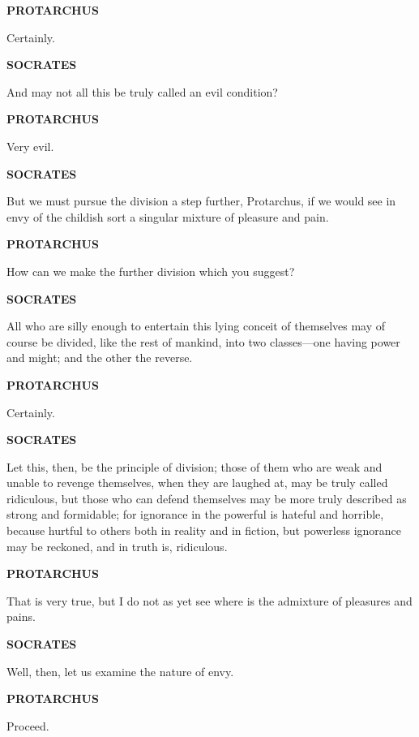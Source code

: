 \documentclass[11pt,letter]{article}
\begin{document}
\par \textbf{PROTARCHUS}
\par   Certainly.

\par \textbf{SOCRATES}
\par   And may not all this be truly called an evil condition?

\par \textbf{PROTARCHUS}
\par   Very evil.

\par \textbf{SOCRATES}
\par   But we must pursue the division a step further, Protarchus, if we would see in envy of the childish sort a singular mixture of pleasure and pain.

\par \textbf{PROTARCHUS}
\par   How can we make the further division which you suggest?

\par \textbf{SOCRATES}
\par   All who are silly enough to entertain this lying conceit of themselves may of course be divided, like the rest of mankind, into two classes—one having power and might; and the other the reverse.

\par \textbf{PROTARCHUS}
\par   Certainly.

\par \textbf{SOCRATES}
\par   Let this, then, be the principle of division; those of them who are weak and unable to revenge themselves, when they are laughed at, may be truly called ridiculous, but those who can defend themselves may be more truly described as strong and formidable; for ignorance in the powerful is hateful and horrible, because hurtful to others both in reality and in fiction, but powerless ignorance may be reckoned, and in truth is, ridiculous.

\par \textbf{PROTARCHUS}
\par   That is very true, but I do not as yet see where is the admixture of pleasures and pains.

\par \textbf{SOCRATES}
\par   Well, then, let us examine the nature of envy.

\par \textbf{PROTARCHUS}
\par   Proceed.
\end{document}
